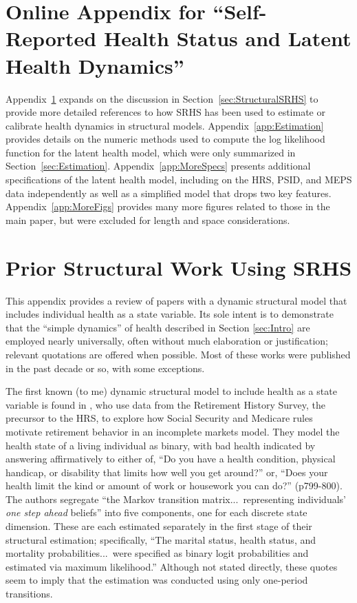 \documentclass[12pt,pdftex,letterpaper]{article}
\begin{document}
\setcounter{table}{3}

\setcounter{figure}{10}

\setcounter{equation}{8}

\appendix

\section*{Online Appendix for ``Self-Reported Health Status and Latent Health Dynamics''}

Appendix~\ref{app:LitQuotes} expands on the discussion in Section~\ref{sec:StructuralSRHS} to provide more detailed references to how SRHS has been used to estimate or calibrate health dynamics in structural models. Appendix~\ref{app:Estimation} provides details on the numeric methods used to compute the log likelihood function for the latent health model, which were only summarized in Section~\ref{sec:Estimation}. Appendix~\ref{app:MoreSpecs} presents additional specifications of the latent health model, including on the HRS, PSID, and MEPS data independently as well as a simplified model that drops two key features. Appendix~\ref{app:MoreFigs} provides many more figures related to those in the main paper, but were excluded for length and space considerations.


\section{Prior Structural Work Using SRHS}\label{app:LitQuotes}

This appendix provides a review of papers with a dynamic structural model that includes individual health as a state variable.  Its sole intent is to demonstrate that the ``simple dynamics'' of health described in Section \ref{sec:Intro} are employed nearly universally, often without much elaboration or justification; relevant quotations are offered when possible.  Most of these works were published in the past decade or so, with some exceptions.

The first known (to me) dynamic structural model to include health as a state variable is found in \cite{RustPhelan97}, who use data from the Retirement History Survey, the precursor to the HRS, to explore how Social Security and Medicare rules motivate retirement behavior in an incomplete markets model.  They model the health state of a living individual as binary, with bad health indicated by answering affirmatively to either of, ``Do you have a health condition, physical handicap, or disability that limits how well you get around?'' or, ``Does your health limit the kind or amount of work or housework you can do?'' (p799-800).  The authors segregate ``the Markov transition matrix...\ representing individuals' \textit{one step ahead} beliefs'' into five components, one for each discrete state dimension.  These are each estimated separately in the first stage of their structural estimation; specifically, ``The marital status, health status, and mortality probabilities...\ were specified as binary logit probabilities and estimated via maximum likelihood.''  Although not stated directly, these quotes seem to imply that the estimation was conducted using only one-period transitions.
\end{document}
